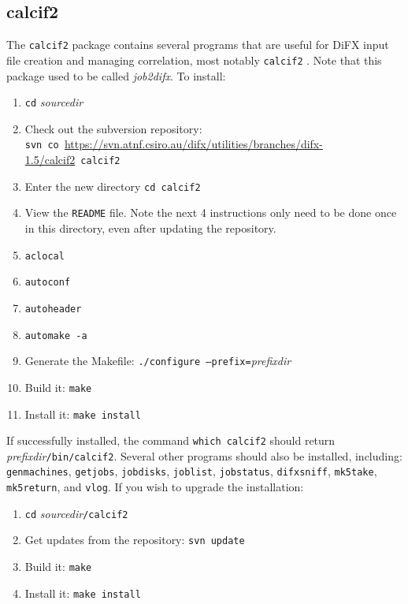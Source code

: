 
\subsection{calcif2} \label{package:calcif2}

The {\tt calcif2} package contains several programs that are useful for DiFX input file creation and managing correlation, most notably {\tt calcif2} .
Note that this package used to be called {\em job2difx}.
To install:
\begin{enumerate}
\item {\tt cd} {\em sourcedir}
\item Check out the subversion repository: \\
{\tt svn co }\url{https://svn.atnf.csiro.au/difx/utilities/branches/difx-1.5/calcif2}{\tt\ calcif2}
\item Enter the new directory {\tt cd calcif2}
\item View the {\tt README} file.  
Note the next 4 instructions only need to be done once in this directory, even after updating the repository.
\item {\tt aclocal}
\item {\tt autoconf}
\item {\tt autoheader}
\item {\tt automake -a}
\item Generate the Makefile: {\tt ./configure --prefix=}{\em prefixdir}
\item Build it: {\tt make}
\item Install it: {\tt make install}
\end{enumerate}

If successfully installed, the command {\tt which calcif2} should return {\em prefixdir}{\tt /bin/calcif2}.
Several other programs should also be installed, including: {\tt genmachines}, {\tt getjobs}, {\tt jobdisks}, {\tt joblist}, {\tt jobstatus}, {\tt difxsniff}, {\tt mk5take}, {\tt mk5return}, and {\tt vlog}.
If you wish to upgrade the installation:
\begin{enumerate}
\item {\tt cd} {\em sourcedir}{\tt /calcif2}
\item Get updates from the repository: {\tt svn update}
\item Build it: {\tt make}
\item Install it: {\tt make install}
\end{enumerate}







